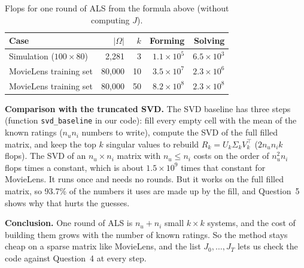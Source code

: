 \begin{table}[h]
\centering
\begin{tabular}{lrrrr}
\hline
Case & $|\Omega|$ & $k$ & Forming & Solving \\
\hline
Simulation ($100 \times 80$) & 2{,}281 & 3 & $1.1\times10^{5}$ & $6.5\times10^{3}$ \\
MovieLens training set & 80{,}000 & 10 & $3.5\times10^{7}$ & $2.3\times10^{6}$ \\
MovieLens training set & 80{,}000 & 50 & $8.2\times10^{8}$ & $2.3\times10^{8}$ \\
\hline
\end{tabular}
\caption{Flops for one round of ALS from the formula above (without computing $J$).}
\label{tab:cost}
\end{table}

\begin{sloppypar}\textbf{Comparison with the truncated SVD.} The SVD baseline has three steps (function \texttt{svd\_baseline} in our code): fill every empty cell with the mean of the known ratings ($n_u n_i$ numbers to write), compute the SVD of the full filled matrix, and keep the top $k$ singular values to rebuild $R_k = U_k \Sigma_k V_k^\top$ ($2n_u n_i k$ flops). The SVD of an $n_u \times n_i$ matrix with $n_u \le n_i$ costs on the order of $n_u^2 n_i$ flops times a constant, which is about $1.5\times10^{9}$ times that constant for MovieLens. It runs once and needs no rounds. But it works on the full filled matrix, so 93.7\% of the numbers it uses are made up by the fill, and Question~5 shows why that hurts the guesses.\end{sloppypar}

\textbf{Conclusion.} One round of ALS is $n_u + n_i$ small $k \times k$ systems, and the cost of building them grows with the number of known ratings. So the method stays cheap on a sparse matrix like MovieLens, and the list $J_0, \dots, J_T$ lets us check the code against Question~4 at every step.
